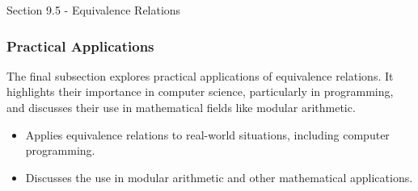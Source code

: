 \begin{notes}{Section 9.5 - Equivalence Relations}
    \subsubsection*{Practical Applications}
    The final subsection explores practical applications of equivalence relations. It highlights their importance in computer science, particularly in programming, and discusses their use in mathematical 
    fields like modular arithmetic.
    \begin{itemize}
        \item Applies equivalence relations to real-world situations, including computer programming.
        \item Discusses the use in modular arithmetic and other mathematical applications.
    \end{itemize}
\end{notes}